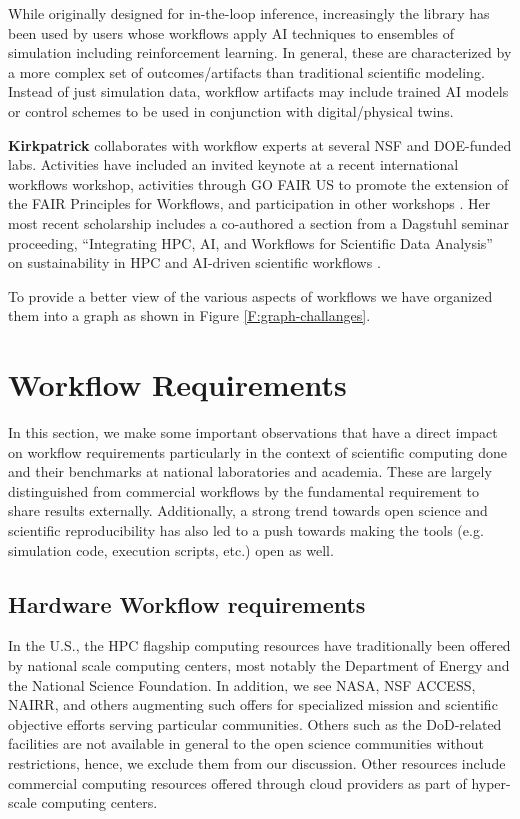 \documentclass[utf8]{FrontiersinVancouver} %
\begin{document}
While originally designed for in-the-loop inference, increasingly the library has been used by users whose workflows apply AI techniques to ensembles of simulation including reinforcement learning. In general, these are characterized by a more complex set of outcomes/artifacts than traditional scientific modeling. Instead of just simulation data, workflow artifacts may include trained AI models or control schemes to be used in conjunction with digital/physical twins. 

{\bf Kirkpatrick} collaborates with workflow experts at several NSF and DOE-funded labs. Activities have included an invited keynote at a recent international workflows workshop, activities through GO FAIR US to promote the extension of the FAIR Principles for Workflows, and participation in other workshops \cite{kirkpatrick2023}. Her most recent scholarship includes a co-authored a section from a Dagstuhl seminar proceeding, ``Integrating HPC, AI, and Workflows for Scientific Data Analysis'' on sustainability in HPC and AI-driven scientific workflows \citep{badia2024integrating}.

To provide a better view of the various aspects of workflows we have organized them into a graph as shown in Figure \ref{F:graph-challanges}.




\section{Workflow Requirements}

In this section, we make some important observations that have a direct impact on workflow requirements particularly in the context of scientific computing done and their benchmarks at national laboratories and academia. These are largely distinguished from commercial workflows by the fundamental requirement to share results externally. Additionally, a strong trend towards open science and scientific reproducibility has also led to a push towards making the tools (e.g. simulation code, execution scripts, etc.) open as well.  

\subsection{Hardware Workflow requirements}\label{sec:hw-requirements}

In the U.S., the HPC flagship computing resources have traditionally been offered by national scale computing centers, most notably the Department of Energy and the National Science Foundation. In addition, we see NASA, NSF ACCESS, NAIRR, and others augmenting such offers for specialized mission and scientific objective efforts serving particular communities. Others such as the DoD-related facilities are not available in general to the open science communities without restrictions, hence, we exclude them from our discussion. Other resources include commercial computing resources offered through cloud providers as part of hyper-scale computing centers.
\end{document}
